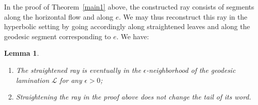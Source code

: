 \documentclass[11pt]{article} %
\theoremstyle{plain}
\newtheorem{lm}[thm]{Lemma}
\theoremstyle{definition}
\numberwithin{equation}{section}
\begin{document}
In the proof of Theorem~\ref{main1} above, the constructed ray consists of segments along the horizontal flow and along $e$. We may thus reconstruct this ray in the hyperbolic setting by going accordingly along straightened leaves and along the geodesic segment corresponding to $e$. We have:
\begin{lm}\label{lm:close}
\begin{enumerate}[topsep=0mm, itemsep=0mm, label=\normalfont{(\arabic*)}]
    \item The straightened ray is eventually in the $\epsilon$-neighborhood of the geodesic lamination $\mathcal{L}$ for any $\epsilon>0$;
    \item Straightening the ray in the proof above does not change the tail of its word.
\end{enumerate}
\end{lm}
\end{document}
